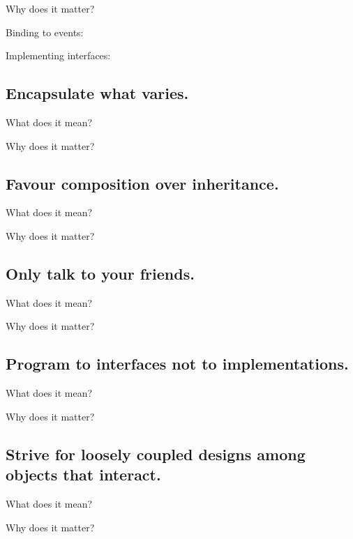 \documentclass{beamer}
\begin{document}
\begin{frame}{Why does it matter?}
\end{frame}

\begin{frame}{Binding to events:}
    
\end{frame}

\begin{frame}{Implementing interfaces:}
    
\end{frame}

\subsection{Encapsulate what varies.}

\begin{frame}{What does it mean?}
\end{frame}

\begin{frame}{Why does it matter?}
\end{frame}

\subsection{Favour composition over inheritance.}

\begin{frame}{What does it mean?}
\end{frame}

\begin{frame}{Why does it matter?}
\end{frame}

\subsection{Only talk to your friends.}

\begin{frame}{What does it mean?}
\end{frame}

\begin{frame}{Why does it matter?}
\end{frame}

\subsection{Program to interfaces not to implementations.}

\begin{frame}{What does it mean?}
\end{frame}

\begin{frame}{Why does it matter?}
\end{frame}

\subsection{Strive for loosely coupled designs among objects that interact.}

\begin{frame}{What does it mean?}
\end{frame}

\begin{frame}{Why does it matter?}
\end{frame}
\end{document}

